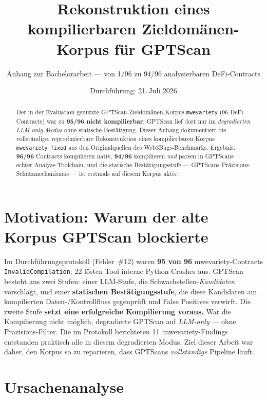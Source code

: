 \documentclass[11pt,a4paper]{scrartcl}
\title{Rekonstruktion eines kompilierbaren Zieldomänen-Korpus für GPTScan}
\subtitle{Anhang zur Bachelorarbeit --- von 1/96 zu 94/96 analysierbaren DeFi-Contracts}
\date{Durchführung: 21.\,Juli 2026}
\newcommand{\code}[1]{\texttt{#1}}
\begin{document}
\maketitle

\begin{abstract}
\noindent
Der in der Evaluation genutzte GPTScan-Zieldomänen-Korpus \code{mwevariety} (96
DeFi-Contracts) war zu \textbf{95/96 nicht kompilierbar}; GPTScan lief dort nur im
\emph{degradierten LLM-only-Modus} ohne statische Bestätigung. Dieser Anhang
dokumentiert die vollständige, reproduzierbare Rekonstruktion eines
kompilierbaren Korpus \code{mwevariety\_fixed} aus den Originalquellen des
Web3Bugs-Benchmarks. Ergebnis: \textbf{96/96} Contracts kompilieren nativ,
\textbf{94/96} kompilieren \emph{und} parsen in GPTScans echter
Analyse-Toolchain, und die statische Bestätigungsstufe --- GPTScans
Präzisions-Schutzmechanismus --- ist erstmals auf diesem Korpus aktiv.
\end{abstract}

\section{Motivation: Warum der alte Korpus GPTScan blockierte}

Im Durchführungsprotokoll (Fehler~\#12) waren \textbf{95 von 96}
mwevariety-Contracts \code{InvalidCompilation}; 22 lösten Tool-interne
Python-Crashes aus. GPTScan besteht aus zwei Stufen: einer LLM-Stufe, die
Schwachstellen-\emph{Kandidaten} vorschlägt, und einer \textbf{statischen
Bestätigungsstufe}, die diese Kandidaten am kompilierten Daten-/Kontrollfluss
gegenprüft und False Positives verwirft. Die zweite Stufe \textbf{setzt eine
erfolgreiche Kompilierung voraus.} War die Kompilierung nicht möglich, degradierte
GPTScan auf \emph{LLM-only} --- ohne Präzisions-Filter. Die im Protokoll
berichteten 11~mwevariety-Findings entstanden praktisch alle in diesem
degradierten Modus. Ziel dieser Arbeit war daher, den Korpus so zu reparieren,
dass GPTScans \emph{vollständige} Pipeline läuft.

\section{Ursachenanalyse}
\end{document}
